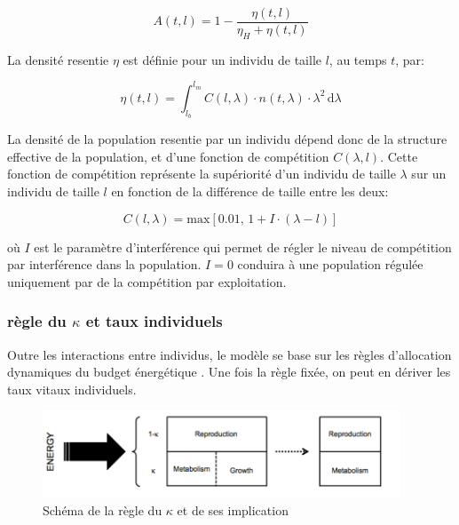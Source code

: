\begin{equation}
\label{eq_an1}
A(t,l)=1-\frac{\eta(t,l)}{\eta_H+\eta(t,l) }  
\end{equation}

La densité resentie $\eta$ est définie pour un individu de taille $l$, au temps
$t$, par:

\begin{equation}
\label{eq_an2}
\eta(t,l)=\int_{l_b}^{l_m} \! C(l,\lambda)\cdot n(t,\lambda)\cdot\lambda^2\, \mathrm{d}\lambda
\end{equation}

La densité de la population resentie par un individu dépend donc de la structure
effective de la population, et d'une fonction de compétition $C(\lambda ,l)$.
Cette fonction de compétition représente la supériorité d'un individu de taille
$\lambda$ sur un individu de taille $l$ en fonction de la différence de taille
entre les deux:

\begin{equation}
\label{eq_an3}
C(l,\lambda) = \mathrm{max}\left[ 0.01,\, 1+I\cdot(\lambda-l) \right]
\end{equation}

où $I$ est le paramètre d'interférence qui permet de régler le niveau de
compétition par interférence dans la population. $I=0$ conduira à une population
régulée uniquement par de la compétition par exploitation. 

\subsubsection{règle du $\kappa$ et taux individuels}

Outre les interactions entre individus, le modèle se base sur les règles
d'allocation dynamiques du budget énergétique \autocites{kooijman2000a}. Une fois la règle fixée, on peut en
dériver les taux vitaux individuels. 

\begin{figure}[!ht]
\begin{center}
\includegraphics[width=0.95\textwidth]{1_CorpsDeThese/Resumes/Fig/AN01}
\caption[Règle du
$\kappa$]{Schéma de la règle du $\kappa$ et de ses implication}
\label{fig:AN1}
\end{center}
\end{figure}

